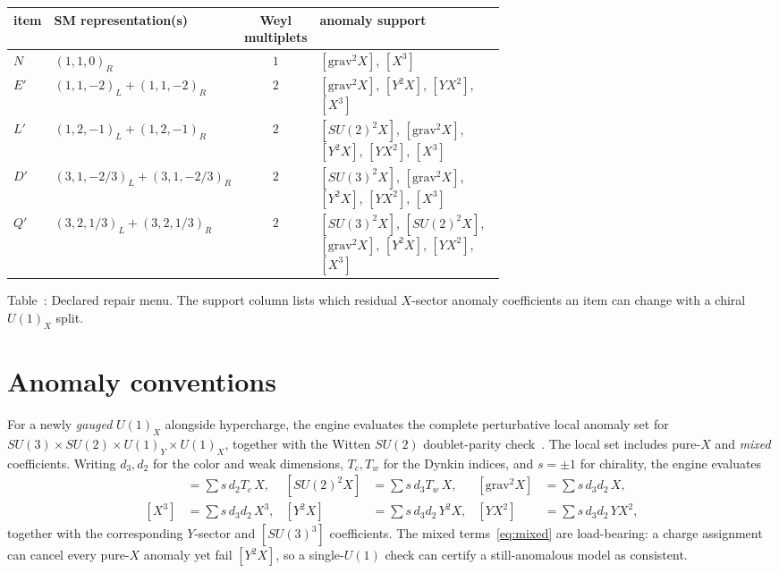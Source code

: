 \documentclass[11pt]{article}
\newcommand{\UY}{U(1)_Y}
\newcommand{\UX}{U(1)_X}
\newcommand{\SUthree}{SU(3)}
\newcommand{\SUtwo}{SU(2)}
\begin{document}
\begin{center}
\centering
\small
\begin{tabular}{@{}l>{\raggedright\arraybackslash}p{0.24\linewidth}c>{\raggedright\arraybackslash}p{0.40\linewidth}@{}}
\toprule
item & SM representation(s) & Weyl multiplets & anomaly support \\
\midrule
$N$ & $(1,1,0)_R$ & $1$ & $[\text{grav}^2X]$, $[X^3]$ \\
$E'$ & $(1,1,-2)_L+(1,1,-2)_R$ & $2$ &
$[\text{grav}^2X]$, $[Y^2X]$, $[YX^2]$, $[X^3]$ \\
$L'$ & $(1,2,-1)_L+(1,2,-1)_R$ & $2$ &
$[\SUtwo^2X]$, $[\text{grav}^2X]$, $[Y^2X]$, $[YX^2]$, $[X^3]$ \\
$D'$ & $(3,1,-2/3)_L+(3,1,-2/3)_R$ & $2$ &
$[\SUthree^2X]$, $[\text{grav}^2X]$, $[Y^2X]$, $[YX^2]$, $[X^3]$ \\
$Q'$ & $(3,2,1/3)_L+(3,2,1/3)_R$ & $2$ &
$[\SUthree^2X]$, $[\SUtwo^2X]$, $[\text{grav}^2X]$, $[Y^2X]$, $[YX^2]$, $[X^3]$ \\
\bottomrule
\end{tabular}
\par\medskip
{}\label{tab:menu}
Table~\thetable: Declared repair menu. The support column lists which residual
$X$-sector anomaly coefficients an item can change with a chiral $\UX$ split.
\end{center}

\section{Anomaly conventions}

For a newly \emph{gauged} $\UX$ alongside hypercharge, the engine evaluates the
complete perturbative local anomaly set for
$\SUthree\times\SUtwo\times\UY\times\UX$, together with the Witten $\SUtwo$
doublet-parity check~\cite{witten}. The local set includes pure-$X$ and
\emph{mixed} coefficients. Writing $d_3,d_2$ for the color and weak dimensions,
$T_c,T_w$ for the Dynkin indices, and $s=\pm1$ for chirality, the engine
evaluates
\begin{align}
[\SUthree^2 X] &= \textstyle\sum s\,d_2 T_c\,X, &
[\SUtwo^2 X] &= \textstyle\sum s\,d_3 T_w\,X, &
[\text{grav}^2 X] &= \textstyle\sum s\,d_3 d_2\,X, \nonumber\\
[X^3] &= \textstyle\sum s\,d_3 d_2\,X^3, &
[Y^2 X] &= \textstyle\sum s\,d_3 d_2\,Y^2 X, &
[Y X^2] &= \textstyle\sum s\,d_3 d_2\,Y X^2,
\label{eq:mixed}
\end{align}
together with the corresponding $Y$-sector and $[\SUthree^3]$ coefficients. The
mixed terms~\eqref{eq:mixed} are load-bearing: a charge assignment can cancel
every pure-$X$ anomaly yet fail $[Y^2 X]$, so a single-$U(1)$ check can certify
a still-anomalous model as consistent.
\end{document}
